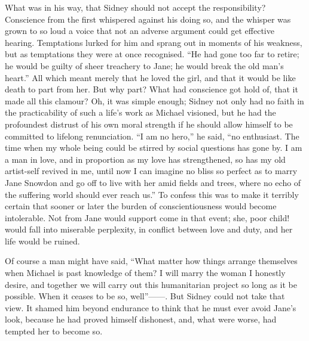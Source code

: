 What was in his way, that Sidney should not accept the responsibility?
Conscience from the first whispered against his doing so, and the
whisper was grown to so loud a voice that not an adverse argument could
get effective hearing. Temptations lurked for him and sprang out in
moments of his weakness, but as temptations they were at once
recognised. ``He had gone too far to retire; he would be guilty of sheer
treachery to Jane; he would break the old man's heart.'' All which meant
merely that he loved the girl, and that it would be like death to part
from her. But why part? What had conscience got hold of, that it made
all this clamour? Oh, it was simple enough; Sidney not only had no faith
in the practicability of such a life's work as Michael visioned, but he
had the profoundest distrust {\protect\hypertarget{274}{}{}}of his own
moral strength if he should allow himself to be committed to lifelong
renunciation. ``I am no hero,'' he said, ``no enthusiast. The time when
my whole being could be stirred by social questions has gone by. I am a
man in love, and in proportion as my love has strengthened, so has my
old artist-self revived in me, until now I can imagine no bliss so
perfect as to marry Jane Snowdon and go off to live with her amid fields
and trees, where no echo of the suffering world should ever reach us.''
To confess this was to make it terribly certain that sooner or later the
burden of conscientiousness would become intolerable. Not from Jane
would support come in that event; she, poor child! would fall into
miserable perplexity, in conflict between love and duty, and her life
would be ruined.

Of course a man might have said, ``What matter how things arrange
themselves when Michael is past knowledge of them? I will marry the
woman I honestly desire, and together we will carry out this
humanitarian {\protect\hypertarget{275}{}{}}project so long as it be
possible. When it ceases to be so, well''{{------}}. But Sidney could
not take that view. It shamed him beyond endurance to think that he must
ever avoid Jane's look, because he had proved himself dishonest, and,
what were worse, had tempted her to become so.

